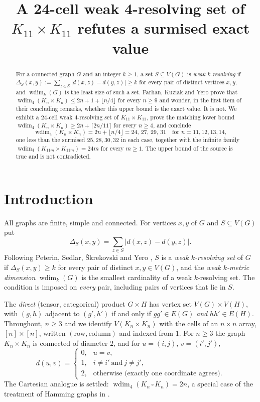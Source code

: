\documentclass[11pt]{amsart}
\title[A 24-cell weak 4-resolving set of $K_{11}\times K_{11}$]
{A 24-cell weak 4-resolving set of $K_{11}\times K_{11}$
 refutes a surmised exact value}
\date{}
\theoremstyle{remark}
\DeclareMathOperator{\wdim}{wdim}
\begin{document}
\begin{abstract}
For a connected graph $G$ and an integer $k\ge1$, a set $S\subseteq V(G)$ is
\emph{weak $k$-resolving} if
$\Delta_S(x,y):=\sum_{z\in S}\lvert d(x,z)-d(y,z)\rvert\ge k$ for every pair of
distinct vertices $x,y$, and $\wdim_k(G)$ is the least size of such a set.
Farhan, Kuziak and Yero prove that
$\wdim_4(K_n\times K_n)\le 2n+1+\lfloor n/4\rfloor$ for every $n\ge9$ and
wonder, in the first item of their concluding remarks, whether this upper bound
is the exact value. It is not. We exhibit a $24$-cell weak $4$-resolving set of
$K_{11}\times K_{11}$, prove the matching lower bound
$\wdim_4(K_n\times K_n)\ge 2n+\lceil 2n/11\rceil$ for every $n\ge4$, and
conclude
\[
  \wdim_4(K_n\times K_n)=2n+\lfloor n/4\rfloor=24,\,27,\,29,\,31
  \quad\text{for } n=11,12,13,14,
\]
one less than the surmised $25,28,30,32$ in each case, together with the
infinite family $\wdim_4(K_{11m}\times K_{11m})=24m$ for every $m\ge1$. The
upper bound of the source is true and is not contradicted.
\end{abstract}

\maketitle

\section{Introduction}

All graphs are finite, simple and connected. For vertices $x,y$ of $G$ and
$S\subseteq V(G)$ put
\[
  \Delta_S(x,y)=\sum_{z\in S}\bigl\lvert d(x,z)-d(y,z)\bigr\rvert .
\]
Following Peterin, Sedlar, \v{S}krekovski and Yero \cite{PSSY}, $S$ is a
\emph{weak $k$-resolving set} of $G$ if $\Delta_S(x,y)\ge k$ for every pair of
distinct $x,y\in V(G)$, and the \emph{weak $k$-metric dimension} $\wdim_k(G)$
is the smallest cardinality of a weak $k$-resolving set. The condition is
imposed on \emph{every} pair, including pairs of vertices that lie in $S$.

The \emph{direct} (tensor, categorical) product $G\times H$ has vertex set
$V(G)\times V(H)$, with $(g,h)$ adjacent to $(g',h')$ if and only if
$gg'\in E(G)$ \emph{and} $hh'\in E(H)$. Throughout, $n\ge3$ and we identify
$V(K_n\times K_n)$ with the cells of an $n\times n$ array,
$[n]\times[n]$, written $(\text{row},\text{column})$ and indexed from $1$. For
$n\ge3$ the graph $K_n\times K_n$ is connected of diameter $2$, and for
$u=(i,j)$, $v=(i',j')$,
\begin{equation}\label{eq:dist}
  d(u,v)=
  \begin{cases}
    0,&u=v,\\
    1,&i\ne i'\ \text{and}\ j\ne j',\\
    2,&\text{otherwise (exactly one coordinate agrees).}
  \end{cases}
\end{equation}
The Cartesian analogue is settled: $\wdim_4(K_n\,\square\,K_n)=2n$, a special
case of the treatment of Hamming graphs in \cite{FKKMY}.
\end{document}
